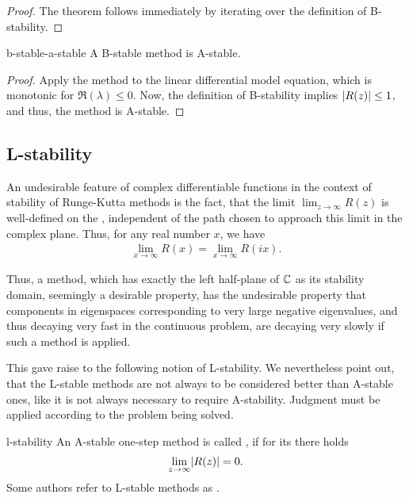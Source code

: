 \begin{proof}
  The theorem follows immediately by iterating over the definition of
  B-stability.
\end{proof}

\begin{Corollary}{b-stable-a-stable}
  A B-stable method is A-stable.
\end{Corollary}

\begin{proof}
  Apply the method to the linear differential model equation, which is
  monotonic for $\Re(\lambda) \le 0$. Now, the definition of B-stability
  implies $\lvert R(z)\rvert \le 1$, and thus, the method is A-stable.
\end{proof}

\subsection{L-stability}

An undesirable feature of complex differentiable functions in the
context of stability of Runge-Kutta methods is the fact, that the
limit $\lim_{z\to \infty} R(z)$ is well-defined on the ,
independent of the
path chosen to approach this limit in the complex plane. Thus, for any
real number $x$, we have
\begin{gather}
  \lim_{x\to\infty} R(x) = \lim_{x\to\infty} R(ix).
\end{gather}

Thus, a method, which has exactly the left half-plane of $\mathbb C$ as its
stability domain, seemingly a desirable property, has the undesirable
property that components in eigenspaces corresponding to very large
negative eigenvalues, and thus decaying very fast in the continuous
problem, are decaying very slowly if such a method is applied.

This gave raise to the following notion of L-stability. We
nevertheless point out, that the L-stable methods are not always to be
considered better than A-stable ones, like it is not always necessary
to require A-stability. Judgment must be applied according to the
problem being solved.

\begin{Definition}{l-stability}
  An A-stable one-step method is called , if for its
   there holds
  \begin{gather}
    \lim_{z\to\infty} \lvert R(z)\rvert = 0.
  \end{gather}
  Some authors refer to L-stable methods as .
\end{Definition}


